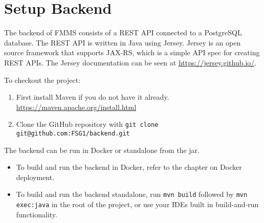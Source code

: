 \chapter{Setup Backend}

The backend of FMMS consists of a REST API connected to a PostgreSQL database. The REST API is written in Java using Jersey. Jersey is an open source framework that supports JAX-RS, which is a simple API spec for creating REST APIs. The Jersey documentation can be seen at \url{https://jersey.github.io/}.

To checkout the project:
\begin{enumerate}
	\item First install Maven if you do not have it already. \\ 
	\url{https://maven.apache.org/install.html}
	\item Clone the GitHub repository with \texttt{git clone git@github.com:FSG1/backend.git}
\end{enumerate}

The backend can be run in Docker or standalone from the jar.
\begin{itemize}
	\item To build and run the backend in Docker, refer to the chapter on Docker deployment.
	\item To build and run the backend standalone, run \texttt{mvn build} followed by \texttt{mvn exec:java} in the root of the project, or use your IDEs built in build-and-run functionality.	
\end{itemize}